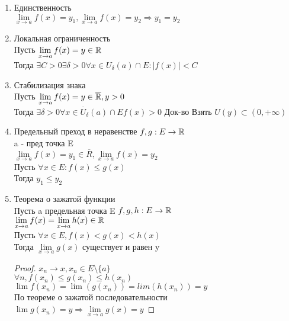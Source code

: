 \begin{enumerate}
	\item Единственность \\
	$ \lim\limits_{x \rightarrow a} f(x) = y_1, \lim\limits_{x \rightarrow a} f(x) = y_2 \Rightarrow y_1 = y_2 $ \\
	\item Локальная ограниченность \\
	Пусть $  \lim\limits_{x \rightarrow a} f(x) = y \in \mathbb{R} $ \\
	Тогда $ \exists C > 0 \exists \delta > 0 \forall x \in U_{\delta} (a) \cap E : |f(x)| < C $ \\ %
	\item Стабилизация знака \\
	Пусть  $ \lim\limits_{x \rightarrow a} f(x)  = y \in \overline{\mathbb{R}}, y >0$ \\
	Тогда $ \exists \delta > 0 \forall x \in \dot{U_\delta} (a) \cap E f(x) > 0 $
	Док-во Взять $ U(y) \subset (0, +\infty) $
	\item Предельный преход в неравенстве
	$ f, g : E \rightarrow \mathbb{R}$\\
	a - пред точка E \\
	$   \lim\limits_{x \rightarrow a} f(x) = y_1 \in \overline{R},  \lim\limits_{x \rightarrow a} f(x) = y_2 $ \\
	Пусть $ \forall x \in E : f(x) \leq g(x) $\\
	Тогда $ y_1 \leq y_2 $\\ %
	\item Теорема о зажатой функции \\
	Пусть a  предельная точка E $ f,g,h : E \rightarrow \mathbb{R} $\\
	$  \lim\limits_{x \rightarrow a} f(x) =  \lim\limits_{x \rightarrow a} h(x) \in \mathbb{R} $ \\
	Пусть $ \forall x \in E, f(x) < g(x) < h(x) $ \\
	Тогда $  \lim\limits_{x \rightarrow a} g(x)  $ существует и равен y \\
	\begin{proof}
		$ x_n \rightarrow x, x_n \in E \setminus \{a\} $ \\
		$ \forall n, f(x_n) \leq g(x_n) \leq h(x_n) $ \\
		$ \lim f(x_n) = \lim(g(x_n)) = lim(h(x_n)) = y$\\
		По теореме о зажатой последовательности $ \lim g(x_n) = y \Rightarrow  \lim\limits_{x \rightarrow a} g(x) = y $ 
	\end{proof}
	
\end{enumerate}

